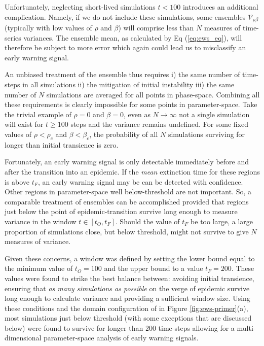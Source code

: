Unfortunately, neglecting short-lived simulations $t<100$ introduces an additional complication. %
Namely, if we do not include these simulations, some ensembles $\mathcal{V}_{\rho\beta}$ %
(typically with low values of $\rho$ and $\beta$) will comprise less than $N$ measures of %
time-series variances. The ensemble mean, as calculated by Eq (\ref{eq:ews_eq}), will therefore %
be subject to more error which again could lead us to misclassify an early warning signal. %

An unbiased treatment of the ensemble thus requires i) the same number of time-steps in all %
simulations ii) the mitigation of initial instability iii) the same number of $N$ simulations %
are averaged for all points in phase-space. Combining all these requirements is clearly impossible %
for some points in parameter-space. Take the trivial example of $\rho=0$ and $\beta=0$, even %
as $N\rightarrow\infty$ not a single simulation will exist for $t\geq100$ steps and the %
variance remains undefined. For some fixed values of $\rho < \rho_c$ and $\beta<\beta_c$, %
the probability of all $N$ simulations surviving for longer than initial transience is zero. %

Fortunately, an early warning signal is only detectable immediately before and after the %
transition into an epidemic. If the \textit{mean} extinction time for these regions is %
above $t_F$, an early warning signal may be can be detected with confidence. %
Other regions in parameter-space well below-threshold are not important. %
So, a comparable treatment of ensembles can be accomplished provided that regions just %
below the point of epidemic-transition survive long enough to measure variance in the %
window $t \in [t_O, t_F]$. Should the value of $t_F$ be too large, a large proportion of %
simulations close, but below threshold, might not survive to give $N$ measures of variance. %

Given these concerns, a window was defined by setting the lower bound equal to the minimum %
value of $t_O=100$ and the upper bound to a value $t_F = 200$. %
These values were found to strike the best balance between: avoiding initial transience, %
ensuring that \textit{as many simulations as possible} on the verge of epidemic survive long %
enough to calculate variance and providing a sufficient window size. Using these conditions %
and the domain configuration of in Figure \ref{fig:ews-primer}(a), most simulations just below %
threshold (with some exceptions that are discussed below) were found to survive for longer %
than $200$ time-steps allowing for a multi-dimensional parameter-space analysis of early %
warning signals. %
 
